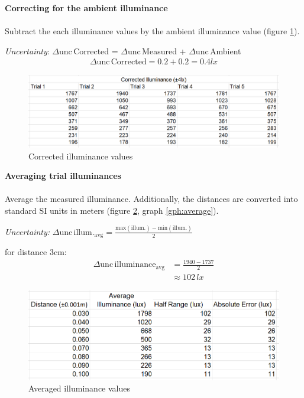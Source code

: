 \documentclass[a4paper,12pt]{article}
\newcommand{\absun}{\Delta \text{unc}\,}
\newcommand{\paragraphnl}[1]{\textbf{#1}\\\\}
\begin{document}
\paragraphnl{Correcting for the ambient illuminance}
Subtract the each illuminance values by the ambient illuminance value (figure \ref{fig:corrected}).

\textit{Uncertainty}: $\absun$Corrected = $\absun$Measured + $\absun$Ambient
\begin{align*}
     \absun \text{Corrected} = 0.2 + 0.2 = 0.4\si{lx}
\end{align*}

\begin{figure}[H]
    \centering
    \includegraphics[scale=0.5]{assets/correcteddata.png}
    \caption{Corrected illuminance values}
    \label{fig:corrected}
\end{figure}

\paragraphnl{Averaging trial illuminances}
Average the measured illuminance. Additionally, the distances are converted into standard SI units in meters (figure \ref{fig:average}, graph \ref{gph:average}).

\textit{Uncertainty:} $\absun \text{illum.}_{\text{avg}} = \frac{\text{max}(\text{illum}.) - \text{min}(\text{illum}.)}{2}$

for distance 3cm:
\begin{align*}
 \absun \text{illuminance}_{\text{avg}} &= \frac{1940-1737}{2}\\
 &\approx 102 \,\si{lx}
\end{align*}


\begin{figure}[H]
    \centering
    \includegraphics[scale=0.5]{assets/averagedata.png}
    \caption{Averaged illuminance values}
    \label{fig:average}
\end{figure}
\end{document}
